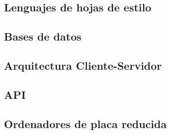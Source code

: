 \subsection{Lenguajes de hojas de estilo}

\subsection{Bases de datos}

\subsection{Arquitectura Cliente-Servidor}

\subsection{API}

\subsection{Ordenadores de placa reducida}



 




